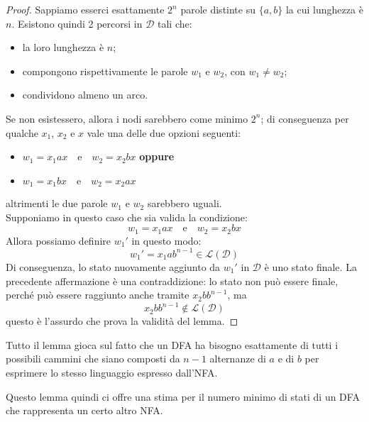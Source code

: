 \documentclass[class=book, crop=false, oneside, 12pt]{standalone}
\begin{document}
\begin{proof}
    Sappiamo esserci esattamente \(2^n\) parole distinte su \(\{a, b\}\) la cui lunghezza è \(n\). Esistono quindi 2 percorsi in \(\mathcal{D}\) tali che:
    \begin{itemize}
        \item la loro lunghezza è \(n\);
        \item compongono rispettivamente le parole \(w_1\) e \(w_2\), con \(w_1 \neq w_2\);
        \item condividono almeno un arco.
    \end{itemize}
    Se non esistessero, allora i nodi sarebbero come minimo \(2^n\); di conseguenza per qualche \(x_1\), \(x_2\) e \(x\) vale una delle due opzioni seguenti:
    \begin{itemize}
        \item \(w_1 = x_1 a x \quad \textrm{e} \quad w_2 = x_2 b x\) \textbf{oppure}
        \item \(w_1 = x_1 b x \quad \textrm{e} \quad w_2 = x_2 a x\)
    \end{itemize}
    altrimenti le due parole \(w_1\) e \(w_2\) sarebbero uguali.\\
    Supponiamo in questo caso che sia valida la condizione:
    \begin{equation*}
        w_1 = x_1 a x \quad \textrm{e} \quad w_2 = x_2 b x
    \end{equation*}
    Allora possiamo definire \(w_1'\) in questo modo:
    \begin{equation*}
        w_1' = x_1 a b^{n-1} \in \mathcal{L}(\mathcal{D})
    \end{equation*}
    Di conseguenza, lo stato nuovamente aggiunto da \(w_1'\) in \(\mathcal{D}\) è uno stato finale.
    La precedente affermazione è una contraddizione: lo stato non può essere finale, perché può essere raggiunto anche tramite \(x_2 b b^{n-1}\), ma 
    \begin{equation*}
        x_2 b b^{n-1} \notin \mathcal{L}(\mathcal{D})
    \end{equation*}
    questo è l'assurdo che prova la validità del lemma.
\end{proof}
Tutto il lemma gioca sul fatto che un DFA ha bisogno esattamente di tutti i possibili cammini che siano composti da \(n-1\) alternanze di \(a\) e di \(b\) per esprimere lo stesso linguaggio espresso dall'NFA.

Questo lemma quindi ci offre una stima per il numero minimo di stati di un DFA che rappresenta un certo altro NFA.
\end{document}
